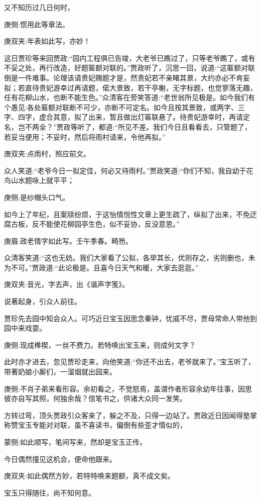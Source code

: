 \begin{parag}
    又不知历过几日何时，\begin{note}庚侧:惯用此等章法。\end{note}\begin{note}庚双夹:年表如此写，亦妙！\end{note}这日贾珍等来回贾政:“园内工程俱已告竣，大老爷已瞧过了，只等老爷瞧了，或有不妥之处，再行改造，好题匾额对联的。”贾政听了，沉思一回，说道:“这匾额对联倒是一件难事。论理该请贵妃赐题才是，然贵妃若不亲睹其景，大约亦必不肯妄拟；若直待贵妃游幸过再请题，偌大景致，若干亭榭，无字标题，也觉寥落无趣，任有花柳山水，也断不能生色。”众清客在旁笑答道:“老世翁所见极是。如今我们有个愚见:各处匾额对联断不可少，亦断不可定名。如今且按其景致，或两字、三字、四字，虚合其意，拟了出来，暂且做出灯匾联悬了。待贵妃游幸时，再请定名，岂不两全？”贾政等听了，都道:“所见不差。我们今日且看看去，只管题了，若妥当便用；不妥时，然后将雨村请来，令他再拟。”\begin{note}庚双夹:点雨村，照应前文。\end{note}众人笑道:“老爷今日一拟定佳，何必又待雨村。”贾政笑道:“你们不知，我自幼于花鸟山水题咏上就平平；\begin{note}庚侧:是纱帽头口气。\end{note}如今上了年纪，且案牍纷烦，于这怡情悦性文章上更生疏了，纵拟了出来，不免迂腐古板，反不能使花柳园亭生色，似不妥协，反没意思。”\begin{note}庚眉:政老情字如此写。壬午季春。畸笏。\end{note}众清客笑道:“这也无妨。我们大家看了公拟，各举其长，优则存之，劣则删也，未为不可。”贾政道:“此论极是。且喜今日天气和暖，大家去逛逛。”\begin{note}庚双夹:音光，字去声，出《谐声字笺》。\end{note}说著起身，引众人前往。
\end{parag}


\begin{parag}
    贾珍先去园中知会众人。可巧近日宝玉因思念秦钟，忧戚不尽，贾母常命人带他到园中来戏耍。\begin{note}庚侧:现成榫楔，一丝不费力。若特唤出宝玉来，则成何文字？\end{note}此时亦才进去，忽见贾珍走来，向他笑道:“你还不出去，老爷就来了。”宝玉听了，带著奶娘小厮们，一溜烟就出园来。\begin{note}庚侧:不肖子弟来看形容。余初看之，不觉怒焉，盖谓作者形容余幼年往事，因思彼亦自写其照，何独余哉？信笔书之，供诸大众同一发笑。\end{note}方转过弯，顶头贾政引众客来了，躲之不及，只得一边站了。贾政近日因闻得塾掌称赞宝玉专能对对联，虽不喜读书，偏倒有些歪才情似的，\begin{note}蒙侧:如此顺写，笔间写来，然却是宝玉正传。\end{note}今日偶然撞见这机会，便命他跟来。\begin{note}庚双夹:如此偶然方妙，若特特唤来题额，真不成文矣。\end{note}宝玉只得随往，尚不知何意。
\end{parag}


